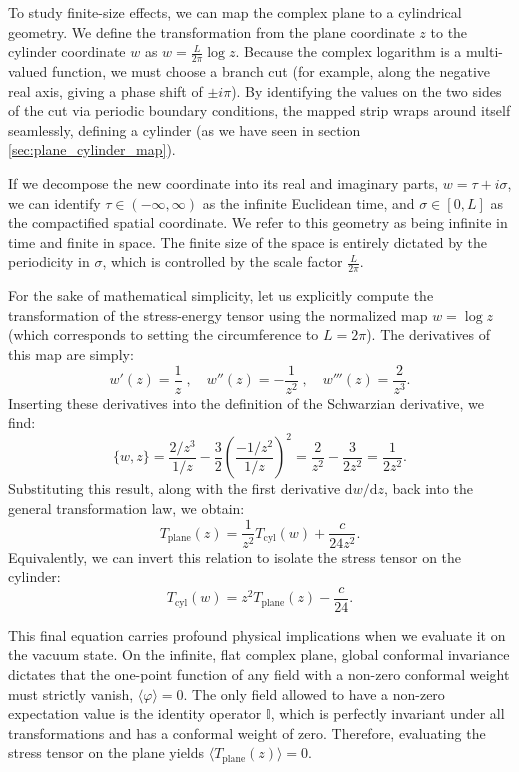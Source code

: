 To study finite-size effects, we can map the complex plane to a cylindrical geometry. We define the transformation from the plane coordinate \(z\) to the cylinder coordinate \(w\) as \(w = \frac{L}{2\pi} \log z\). Because the complex logarithm is a multi-valued function, we must choose a branch cut (for example, along the negative real axis, giving a phase shift of \(\pm i\pi\)). By identifying the values on the two sides of the cut via periodic boundary conditions, the mapped strip wraps around itself seamlessly, defining a cylinder (as we have seen in section \ref{sec:plane_cylinder_map}).

If we decompose the new coordinate into its real and imaginary parts, \(w = \tau + i\sigma\), we can identify \(\tau \in (-\infty, \infty)\) as the infinite Euclidean time, and \(\sigma \in [0, L]\) as the compactified spatial coordinate. We refer to this geometry as being infinite in time and finite in space. The finite size of the space is entirely dictated by the periodicity in \(\sigma\), which is controlled by the scale factor \(\frac{L}{2\pi}\).

For the sake of mathematical simplicity, let us explicitly compute the transformation of the stress-energy tensor using the normalized map \(w = \log z\) (which corresponds to setting the circumference to \(L = 2\pi\)). The derivatives of this map are simply:
\[
    w'(z) = \frac{1}{z} \;, \quad w''(z) = -\frac{1}{z^2} \;, \quad w'''(z) = \frac{2}{z^3}.
\]
Inserting these derivatives into the definition of the Schwarzian derivative, we find:
\[
    \{w, z\} = \frac{2/z^3}{1/z} - \frac{3}{2}\left(\frac{-1/z^2}{1/z}\right)^2 = \frac{2}{z^2} - \frac{3}{2z^2} = \frac{1}{2z^2}.
\]
Substituting this result, along with the first derivative \(\mathrm{d} w/\mathrm{d} z\), back into the general transformation law, we obtain:
\[
    T_{\text{plane}}(z) = \frac{1}{z^2} T_{\text{cyl}}(w) + \frac{c}{24z^2}.
\]
Equivalently, we can invert this relation to isolate the stress tensor on the cylinder:
\[
    T_{\text{cyl}}(w) = z^2 T_{\text{plane}}(z) - \frac{c}{24}.
\]

This final equation carries profound physical implications when we evaluate it on the vacuum state. On the infinite, flat complex plane, global conformal invariance dictates that the one-point function of any field with a non-zero conformal weight must strictly vanish, \(\langle \varphi \rangle = 0\). The only field allowed to have a non-zero expectation value is the identity operator \(\mathbb{I}\), which is perfectly invariant under all transformations and has a conformal weight of zero. Therefore, evaluating the stress tensor on the plane yields \(\langle T_{\text{plane}}(z) \rangle = 0\).

